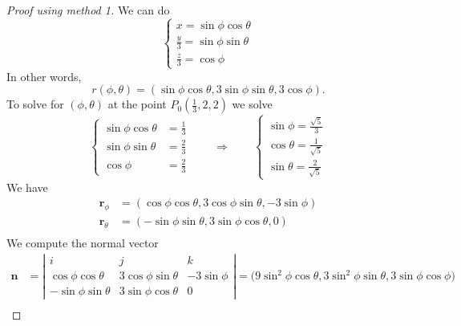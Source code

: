 \begin{proof}[Proof using method 1] We can do
\begin{equation*}
    \begin{cases}
        x = \sin \phi \cos \theta \\
        \frac{y}{3} = \sin \phi \sin \theta \\
        \frac{z}{3} = \cos \phi
    \end{cases}
\end{equation*}
In other words,
\begin{equation*}
    r(\phi, \theta) = (\sin \phi \cos \theta , 3\sin \phi \sin \theta, 3\cos\phi).
\end{equation*}
To solve for $(\phi,\theta)$ at the point $P_0\left(\frac{1}{3}, 2,2\right)$ we solve
\begin{equation*}
    \begin{cases}
        \sin \phi\cos \theta &= \frac{1}{3}\\
        \sin \phi\sin \theta &= \frac{2}{3}\\
        \cos \phi &= \frac{2}{3}
    \end{cases}\qquad\Longrightarrow\qquad 
    \begin{cases}
    \sin\phi = \frac{\sqrt{5}}{3}    \\
    \cos\theta = \frac{1}{\sqrt{5}}\\
    \sin\theta = \frac{2}{\sqrt{5}}
    \end{cases}
\end{equation*}
We have 
\begin{equation*}
\begin{aligned}
    \textbf{r}_\phi &= (\cos \phi \cos\theta, 3\cos\phi\sin\theta, -3\sin\phi)  \\
    \textbf{r}_\theta &= (-\sin \phi \sin\theta, 3\sin\phi\cos\theta, 0)  \\
\end{aligned} 
\end{equation*}
We compute the normal vector
\begin{equation*}
\begin{aligned}
    \textbf{n} 
    &= 
    \left|
    \begin{array}{ccc}
         i & j & k  \\
         \cos \phi \cos\theta &  3\cos\phi\sin\theta & -3\sin\phi\\
         -\sin \phi \sin\theta & 3\sin\phi\cos\theta & 0
    \end{array}
    \right|=\Big(9\sin^2\phi\cos\theta, 3\sin^2\phi\sin \theta, 3\sin\phi\cos\phi\Big)\\

\end{aligned}
\end{equation*}
\end{proof}
